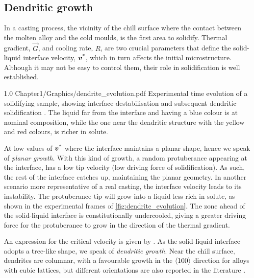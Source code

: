 \subsection{Dendritic growth}
In a casting process, the vicinity of the chill surface where the contact between the molten alloy and the cold moulds, is the first area to solidify. 
Thermal gradient, $\vec{G}$, and cooling rate, $R$, are two crucial parameters that define the solid-liquid interface velocity, $\boldsymbol{v^\text{*}}$, which in turn
affects the initial microstructure. Although it may not be easy to control them, their role in solidification is well established.


\begin{figureth}
{1.0}
{Chapter1/Graphics/dendrite_evolution.pdf}
{Experimental time evolution of a solidifying  sample, showing interface destabilisation 
and subsequent dendritic solidification \citep{buffet_measurement_2010}.
The liquid far from the interface and having a blue colour is at nominal composition, 
while the one near the dendritic structure with the yellow and red colours, is richer in solute.}
\label{fig:dendrite_evolution}
\end{figureth}
%

At low values of $\boldsymbol{v^\text{*}}$ where the interface maintains a planar shape, hence we speak of \emph{planar growth}. 
With this kind of growth, a random protuberance appearing at the interface, has a low tip velocity (low driving force of solidification). As such,
the rest of the interface catches up, maintaining the planar geometry.
In another scenario more representative of a real casting, the interface velocity leads to its instability.
The protuberance tip will grow into a liquid less rich in solute, as shown in the experimental frames of \cref{fig:dendrite_evolution}.
The zone ahead of the solid-liquid interface is constitutionally undercooled, giving a greater driving force for the protuberance to grow in the direction
of the thermal gradient. 

An expression for the critical velocity is given by \citet{tiller_redistribution_1953}.
As the solid-liquid interface adopts a tree-like shape, we speak of \emph{dendritic growth}. Near the chill surface, dendrites are columnar, with a 
favourable growth in the $\langle 100 \rangle$ direction for alloys with cubic lattices, but different orientations are also reported in the literature \citep[see][289]{dantzig_solidification_2009}.

